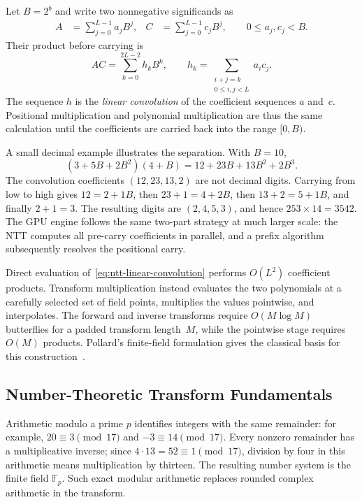 Let $B=2^b$ and write two nonnegative significands as
\begin{align}
  A &= \sum_{j=0}^{L-1} a_j B^j, &
  C &= \sum_{j=0}^{L-1} c_j B^j,
  \qquad 0\le a_j,c_j < B.
  \label{eq:ntt-positional-inputs}
\end{align}
Their product before carrying is
\begin{equation}
  AC = \sum_{k=0}^{2L-2} h_k B^k,
  \qquad
  h_k = \sum_{\substack{i+j=k\\0\le i,j<L}} a_i c_j.
  \label{eq:ntt-linear-convolution}
\end{equation}
The sequence $h$ is the \emph{linear convolution} of the coefficient sequences
$a$ and~$c$.  Positional multiplication and polynomial multiplication are thus
the same calculation until the coefficients are carried back into the range
$[0,B)$.

A small decimal example illustrates the separation.  With $B=10$,
\begin{equation}
  (3+5B+2B^2)(4+B)=12+23B+13B^2+2B^3.
\end{equation}
The convolution coefficients $(12,23,13,2)$ are not decimal digits.  Carrying
from low to high gives $12=2+1B$, then $23+1=4+2B$, then
$13+2=5+1B$, and finally $2+1=3$.  The resulting digits are
$(2,4,5,3)$, and hence
$253\mathbin{\times}14=3542$.  The GPU engine follows the same two-part
strategy at much larger scale: the NTT computes all pre-carry coefficients in
parallel, and a prefix algorithm subsequently resolves the positional carry.

Direct evaluation of~\eqref{eq:ntt-linear-convolution} performs $O(L^2)$
coefficient products.  Transform multiplication instead evaluates the two
polynomials at a carefully selected set of field points, multiplies the values
pointwise, and interpolates.  The forward and inverse transforms require
$O(M\log M)$ butterflies for a padded transform length~$M$, while the pointwise
stage requires $O(M)$ products.  Pollard's finite-field formulation gives the
classical basis for this construction~\cite{Pollard1971FiniteFieldFFT}.

\subsection{Number-Theoretic Transform Fundamentals}
\label{sec:ntt-multiply}

Arithmetic modulo a prime $p$ identifies integers with the same remainder:
for example, $20\equiv3\pmod{17}$ and $-3\equiv14\pmod{17}$.
Every nonzero remainder has a multiplicative inverse; since
$4\cdot13=52\equiv1\pmod{17}$, division by four in this arithmetic
means multiplication by thirteen.  The resulting number system is the finite
field $\mathbb F_p$.  Such exact modular arithmetic replaces rounded complex
arithmetic in the transform.

